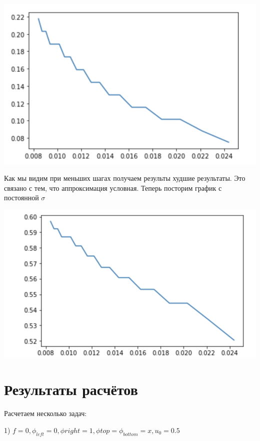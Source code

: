 \documentclass[a4paper]{article}
\begin{document}
\begin{center}
	\includegraphics{2.png}
\end{center}

Как мы видим при меньших шагах получаем результы худшие результаты. Это связано с тем, что аппроксимация условная. 
Теперь посторим график с постоянной $\sigma$ 

\begin{center}
	\includegraphics{3.png}
\end{center}

\section{Результаты расчётов}
Расчетаем несколько задач: 

1) $f = 0, \phi_{left} = 0, \phi{right} = 1, \phi{top} = \phi_{bottom} = x, u_0 = 0.5$
\end{document}
